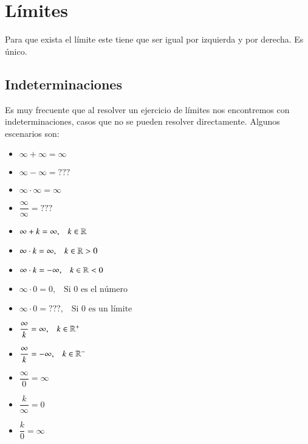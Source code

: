 \section{Límites}

Para que exista el límite este tiene que ser igual por izquierda y por derecha. Es único. 

\subsection{Indeterminaciones}

Es muy frecuente que al resolver un ejercicio de límites nos encontremos con indeterminaciones, casos que no se pueden resolver directamente. Algunos escenarios son:

\begin{multicols}{2}
\begin{itemize}
\item $\infty + \infty = \infty$

\item $\infty - \infty = ???$

\item $\infty \cdot \infty = \infty$

\item $\dfrac{\infty}{\infty} = ???$

\item $\infty + k = \infty, \;\;\;k\in\mathbb{R}$

\item $\infty \cdot k = \infty, \;\;\;k\in\mathbb{R}>0$

\item $\infty \cdot k = -\infty, \;\;\;k\in\mathbb{R}<0$

\item $\infty \cdot 0 = 0, \;\;\;\text{Si 0 es el número}$

\item $\infty \cdot 0 = ???, \;\;\;\text{Si 0 es un límite}$

\item $\dfrac{\infty}{k}= \infty, \;\;\;k\in\mathbb{R}^+$

\item $\dfrac{\infty }{k} = -\infty, \;\;\;k\in\mathbb{R}^-$

\item $\dfrac{\infty }{0} = \infty$

\item $\dfrac{k}{\infty} = 0$

\item $\dfrac{k}{0} = \infty$


\end{itemize}
\end{multicols}
